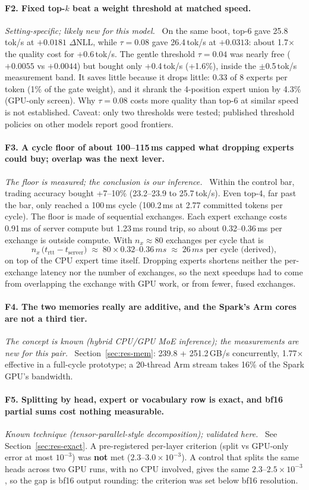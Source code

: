 \documentclass[11pt]{article}
\newcommand{\tps}{\,tok/s}
\newcommand{\ms}{\,ms}
\newcommand{\dNLL}{\Delta\mathrm{NLL}}
\newcommand{\finding}[2]{\paragraph{#1}\emph{#2}\ }
\begin{document}
\finding{F2. Fixed top-$k$ beat a weight threshold at matched speed.}{Setting-specific; likely new for this model.}
On the same boot, top-6 gave 25.8\tps{} at $+0.0181$ $\dNLL$, while $\tau = 0.08$ gave 26.4\tps{} at $+0.0313$: about
1.7$\times$ the quality cost for +0.6\tps. The gentle threshold $\tau = 0.04$ was nearly free ($+0.0055$ vs $+0.0044$)
but bought only +0.4\tps{} (+1.6\%), inside the $\pm$0.5\tps{} measurement band. It saves little because it drops
little: 0.33 of 8 experts per token (1\% of the gate weight), and it shrank the 4-position expert union by 4.3\%
(GPU-only screen). Why $\tau = 0.08$ costs more quality than top-6 at similar speed is not established. Caveat: only two
thresholds were tested; published threshold policies on other models report good frontiers.

\finding{F3. A cycle floor of about 100--115\ms{} capped what dropping experts could buy; overlap was the next lever.}{The
floor is measured; the conclusion is our inference.}
Within the control bar, trading accuracy bought +7--10\% (23.2--23.9 to 25.7\tps). Even top-4, far past the bar, only
reached a 100\ms{} cycle (100.2\ms{} at 2.77 committed tokens per cycle). The floor is made of sequential exchanges. Each
expert exchange costs 0.91\ms{} of server compute but 1.23\ms{} round trip, so about 0.32--0.36\ms{} per exchange is
outside compute. With $n_x \approx 80$ exchanges per cycle that is
\begin{equation}
  n_x\,\big(t_{\text{rtt}} - t_{\text{server}}\big) \;\approx\; 80 \times 0.32\text{--}0.36\ms \;\approx\; 26\ms
  \text{ per cycle (derived)},
  \label{eq:floor}
\end{equation}
on top of the CPU expert time itself. Dropping experts shortens neither the per-exchange latency nor the number of
exchanges, so the next speedups had to come from overlapping the exchange with GPU work, or from fewer, fused exchanges.

\finding{F4. The two memories really are additive, and the Spark's Arm cores are not a third tier.}{The concept is known
(hybrid CPU/GPU MoE inference); the measurements are new for this pair.}
Section~\ref{sec:res-mem}: 239.8 + 251.2\,GB/s concurrently, 1.77$\times$ effective in a full-cycle prototype; a
20-thread Arm stream takes 16\% of the Spark GPU's bandwidth.

\finding{F5. Splitting by head, expert or vocabulary row is exact, and bf16 partial sums cost nothing measurable.}{Known
technique (tensor-parallel-style decomposition); validated here.}
See Section~\ref{sec:res-exact}. A pre-registered per-layer criterion (split vs GPU-only error at most $10^{-3}$) was
\textbf{not} met ($2.3\text{--}3.0\times10^{-3}$). A control that splits the same heads across two GPU runs, with no CPU
involved, gives the same $2.3\text{--}2.5\times10^{-3}$, so the gap is bf16 output rounding: the criterion was set below
bf16 resolution.
\end{document}
